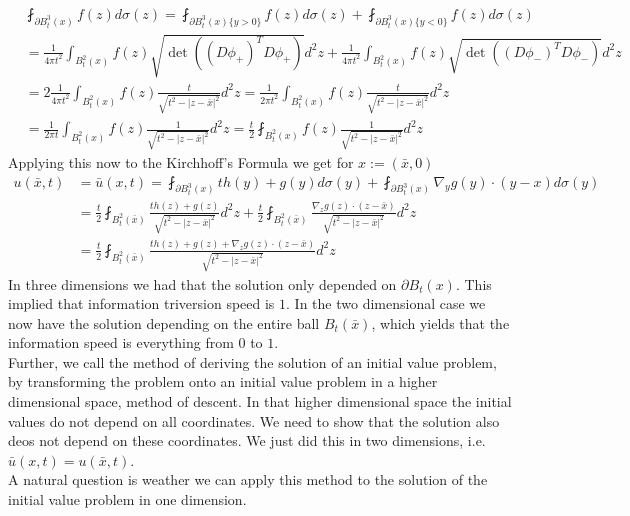 \documentclass[A4,12pt,twoside]{book}
\begin{document}
\begin{align*}
&\fint_{\partial B_t^3 (x)} f(z) d \sigma (z)=\fint_{\partial B_t^3 (x) \{y >0 \}} f(z) d \sigma (z) + \fint_{\partial B_t^3 (x) \{y <0 \}} f(z) d \sigma (z) \\
&= \frac{1}{4 \pi t^2} \int_{ B_t^2 (x) } f(z) \sqrt{\det ( (D \phi_+)^T D\phi_+ )} d^2 z + \frac{1}{4 \pi t^2} \int_{ B_t^2 (x)} f(z) \sqrt{\det ( (D \phi_-)^T D\phi_- )} d^2 z \\
&= 2 \frac{1}{4 \pi t^2} \int_{ B_t^2 (x)} f(z) \frac{t}{\sqrt{t^2 - |z- \bar{x}|^2}} d^2 z = \frac{1}{2 \pi t^2} \int_{ B_t^2 (x)} f(z) \frac{t}{\sqrt{t^2 - |z- \bar{x}|^2}} d^2 z \\
&= \frac{1}{2 \pi t} \int_{ B_t^2 (x)} f(z) \frac{1}{\sqrt{t^2 - |z- \bar{x}|^2}} d^2 z = \frac{t}{2}  \fint_{ B_t^2 (x)} f(z) \frac{1}{\sqrt{t^2 - |z- \bar{x}|^2}} d^2 z
\end{align*}
Applying this now to the Kirchhoff's Formula we get for $x := (\bar{x},0)$
\begin{align*}
    u(\bar{x},t) &= \bar{u} (x,t) = \fint_{\partial B_t^3 (x)} th (y) + g(y) d \sigma (y) + \fint_{\partial B_t^3 (x)} \nabla_{y} g(y) \cdot (y-x) d \sigma (y) \\
    &= \frac{t}{2} \fint_{B_t^2 (\bar{x})} \frac{th(z) + g(z)}{\sqrt{t^2 - |z-\bar{x}|^2}} d^2 z +  \frac{t}{2} \fint_{B_t^2 (\bar{x})} \frac{\nabla_z g(z) \cdot (z- \bar{x})}{\sqrt{t^2 - |z-\bar{x}|^2}} d^2 z \\
    &= \frac{t}{2} \fint_{B_t^2 (\bar{x})} \frac{th(z) + g(z)+\nabla_z g(z) \cdot (z- \bar{x})}{\sqrt{t^2 - |z-\bar{x}|^2}} d^2 z 
\end{align*}
In three dimensions we had that the solution only depended on $\partial B_t (x)$. This implied that information triversion speed is $1$. In the two dimensional case we now have the solution depending on the entire ball $B_t (\bar{x})$, which yields that the information speed is everything from $0$ to $1$.\\

Further, we call the method of deriving the solution of an initial value problem, by transforming the problem onto an initial value problem in a higher dimensional space, method of descent. In that higher dimensional space the initial values do not depend on all coordinates. We need to show that the solution also deos not depend on these coordinates. We just did this in two dimensions, i.e. $\bar{u}(x,t) = u(\bar{x},t)$.\\
A natural question is weather we can apply this method to the solution of the initial value problem in one dimension.
\end{document}
